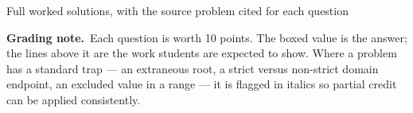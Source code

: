 \documentclass[11pt]{article}
\begin{document}
  {Full worked solutions, with the source problem cited for each question}

\noindent\small
\textbf{Grading note.}\ Each question is worth 10 points. The boxed value is the answer;
the lines above it are the work students are expected to show. Where a problem has a
standard trap --- an extraneous root, a strict versus non-strict domain endpoint, an
excluded value in a range --- it is flagged in italics so partial credit can be applied
consistently.\par

\vspace{4pt}

\end{document}

